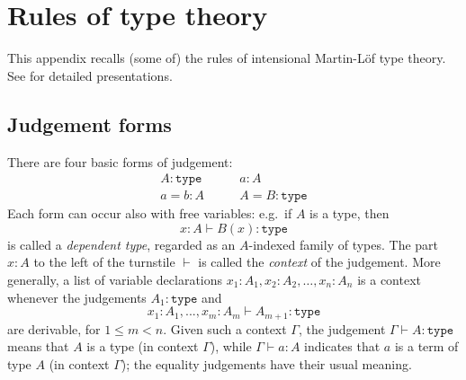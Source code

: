 \documentclass[reqno,12pt]{amsart}
\newcommand{\type}{\texttt{type}}
\newcommand{\judge}[3][]{#2\;\vdash_{#1}\;#3}
\theoremstyle{definition}
\theoremstyle{remark}
\begin{document}
\appendix
\section{Rules of type theory}%

\noindent This appendix recalls (some of) the rules of intensional Martin-L\"of type theory.
See \cite{MartinLof:ITT84,Nordstrom:PMLTT,Jacobs:CLTT} for detailed presentations.


\subsection*{Judgement forms}

There are four basic  forms of judgement:
\begin{align*}
A:\type &\qquad a:A\\
a=b:A &\qquad A = B:\type
\end{align*}
Each form can occur also with free variables: e.g.\ if $A$ is a type, then
\[
x:A \vdash B(x):\type
\]
is called a \emph{dependent type}, regarded as an $A$-indexed family of types. 
The part $x:A$ to the left of the turnstile $\vdash$ is called the \emph{context} of the judgement.   
More generally, a list of variable declarations $x_1:A_1, x_2:A_2,\ldots, x_n:A_n$ is a context whenever the judgements $A_1:\type$ and $$x_1 : A_1, . . . , x_m : A_m \vdash A_{m+1}:\type$$ are derivable, for $1 \leq m < n$. %
Given such a context $\Gamma$, the judgement $\Gamma\vdash A:\type$ means that $A$ is a type (in context $\Gamma$), while $\Gamma\vdash a:A$ indicates that $a$ is a term of type $A$ (in context $\Gamma$); the equality judgements have their usual meaning.


\end{document}
